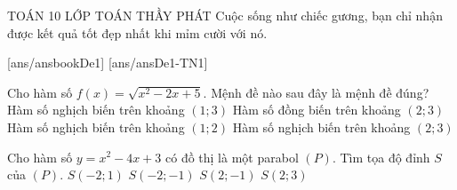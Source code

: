 \begin{name}
	{\tenchude}
	{TOÁN 10}
	{LỚP TOÁN THẦY PHÁT}
	{Cuộc sống như chiếc gương, bạn chỉ nhận được kết quả tốt đẹp nhất khi mỉm cười với nó.}
\end{name}
[ans/ansbookDe1]
\TN
{}[ans/ansDe1-TN1]
\begin{ex}%
	Cho hàm số $ f(x) = \sqrt{x^2 - 2x + 5} $. Mệnh đề nào sau đây là mệnh đề đúng?
	\choice
	{Hàm số nghịch biến trên khoảng $(1;3)$}
	{\True Hàm số đồng biến trên khoảng $(2;3)$}
	{Hàm số nghịch biến trên khoảng $(1;2)$}
	{Hàm số nghịch biến trên khoảng $(2;3)$}
\end{ex}

\begin{ex}%
	Cho hàm số $y=x^2-4x+3$ có đồ thị là một parabol $(P)$. Tìm tọa độ đỉnh $S$ của $(P)$.
	\choice
	{$S(-2;1)$}
	{$S(-2;-1)$}
	{\True $S(2;-1)$}
	{$S(2;3)$}
\end{ex}

